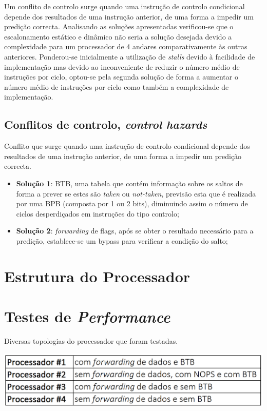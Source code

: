 \documentclass[11pt]{article}
\numberwithin{equation}{section}
\begin{document}
Um conflito de controlo surge quando uma instrução de controlo condicional depende dos resultados de uma instrução anterior, de uma forma a impedir um predição correcta. 
\vspace{-2.5mm}
Analisando as soluções apresentadas verificou-se que o escalonamento estático e dinâmico não seria a solução desejada devido a complexidade para um processador de 4 andares comparativamente às outras anteriores. Ponderou-se inicialmente a utilização de \textit{stalls} devido à facilidade de implementação mas devido ao inconveniente de reduzir o número médio de instruções por ciclo, optou-se pela segunda solução de forma a aumentar o número médio de instruções por ciclo como também a complexidade de implementação.

\subsection{Conflitos de controlo, \textit{control hazards}}
Conflito que surge quando uma instrução de controlo condicional depende dos	resultados de uma instrução anterior, de uma forma a impedir um predição correcta.

\begin{itemize}
	\item \textbf{Solução 1}: BTB, uma tabela que contém informação sobre os saltos de forma a prever se estes são \textit{taken} ou \textit{not-taken}, previsão esta que é realizada por uma BPB (composta por 1 ou 2 bits), diminuindo assim o número de ciclos desperdiçados em instruções do tipo controlo;
	\item \textbf{Solução 2}: \textit{forwarding} de flags, após se obter o resultado necessário para a predição, establece-se um bypass para verificar a condição do salto;
	\vspace{-2.5mm}
\end{itemize}


\section{Estrutura do Processador}

\section{Testes de \textit{Performance}}

\begin{table}[H]
	\centering
	\caption{Diversas topologias do processador que foram testadas.}
	\vspace{-1.5mm}
	\includegraphics[keepaspectratio=true, scale=0.40]{tabelas/processadores}
	\label{tab:processadores}
\end{table}
\end{document}
